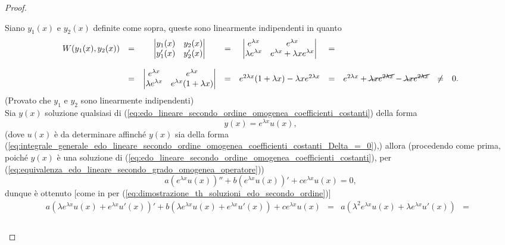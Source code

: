 \begin{proof}
\begin{enumerate}
		\noindent Siano $y_1(x)$ e $y_2(x)$ definite come sopra, queste sono linearmente indipendenti in quanto
		\begin{equation*}
			\begin{matrix}
				W(y_1(x),y_2(x)) &=&\begin{vmatrix}
					y_1(x) & y_2(x)\\
					y_1'(x) & y_2'(x)
				\end{vmatrix} &=&\begin{vmatrix}
					e^{\lambda x} & e^{\lambda x}\\
					\lambda e^{\lambda x} & e^{\lambda  x} + \lambda x e^{\lambda x}
				\end{vmatrix} &=& \\\\
				&=&\begin{vmatrix}
					e^{\lambda x} & e^{\lambda  x}\\
					\lambda  e^{\lambda x} &  e^{\lambda  x} (1 + \lambda x )
				\end{vmatrix} &=&
				 e^{2\lambda x}(1+\lambda x) - \lambda x e^{2\lambda x} &=& e^{2\lambda x} + \cancel{\lambda x e^{2\lambda x}} - \cancel{\lambda x e^{2\lambda x}} &\neq& 0.
			\end{matrix}
		\end{equation*}
		(Provato che $y_1$ e $y_2$ sono linearmente indipendenti)\\
		Sia $y(x)$ soluzione qualsiasi di (\ref{eq:edo_lineare_secondo_ordine_omogenea_coefficienti_costanti}) della forma 
		\begin{equation}\label{eq:integrale_generale_delta_=_0}
			y(x) = e^{\lambda x} u(x),
		\end{equation}
		(dove $u(x)$ è da determinare affinché $y(x)$ sia della forma (\ref{eq:integrale_generale_edo_lineare_secondo_ordine_omogenea_coefficienti_costanti_Delta_=_0}),) allora (procedendo come prima, poiché $y(x)$ è una soluzione di (\ref{eq:edo_lineare_secondo_ordine_omogenea_coefficienti_costanti}), per (\ref{eq:equivalenza_edo_lineare_secondo_grado_omogenea_operatore}))
		\begin{equation*}
			a(e^{\lambda x}u(x))'' + b(e^{\lambda x} u(x))' + c e^{\lambda x} u(x) = 0,
		\end{equation*}
		dunque è ottenuto [come in per (\ref{eq:dimostrazione_th_soluzioni_edo_secondo_ordine})]
		\begin{equation*}
			\begin{matrix}
				a(\lambda e^{\lambda x}u(x)+e^{\lambda x}u'(x))' + b(\lambda e^{\lambda x}u(x) + e^{\lambda x}u'(x)) + ce^{\lambda x}u(x) &=& a(\lambda^2e^{\lambda x} u(x) + \lambda e ^{\lambda x}u'(x)) &=&\\\\

\end{matrix}
\end{equation*}
\end{enumerate}
\end{proof}
